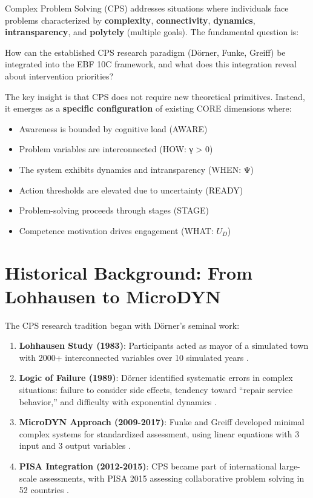Complex Problem Solving (CPS) addresses situations where individuals face problems characterized by \textbf{complexity}, \textbf{connectivity}, \textbf{dynamics}, \textbf{intransparency}, and \textbf{polytely} (multiple goals). The fundamental question is:

\begin{tcolorbox}[colback=yellow!10!white, colframe=orange!75!black,
    title=Central Question]
How can the established CPS research paradigm (Dörner, Funke, Greiff) be integrated into the EBF 10C framework, and what does this integration reveal about intervention priorities?
\end{tcolorbox}

The key insight is that CPS does not require new theoretical primitives. Instead, it emerges as a \textbf{specific configuration} of existing CORE dimensions where:
\begin{itemize}
\item Awareness is bounded by cognitive load (AWARE)
\item Problem variables are interconnected (HOW: γ > 0)
\item The system exhibits dynamics and intransparency (WHEN: Ψ)
\item Action thresholds are elevated due to uncertainty (READY)
\item Problem-solving proceeds through stages (STAGE)
\item Competence motivation drives engagement (WHAT: $U_D$)
\end{itemize}


\section{Historical Background: From Lohhausen to MicroDYN}
\label{sec:cps-history}

The CPS research tradition began with Dörner's seminal work:

\begin{enumerate}
\item \textbf{Lohhausen Study (1983)}: Participants acted as mayor of a simulated town with 2000+ interconnected variables over 10 simulated years \citep{doerner1983lohhausen}.

\item \textbf{Logic of Failure (1989)}: Dörner identified systematic errors in complex situations: failure to consider side effects, tendency toward ``repair service behavior,'' and difficulty with exponential dynamics \citep{doerner1989logik}.

\item \textbf{MicroDYN Approach (2009-2017)}: Funke and Greiff developed minimal complex systems for standardized assessment, using linear equations with 3 input and 3 output variables \citep{greiff2017microdynamapproach}.

\item \textbf{PISA Integration (2012-2015)}: CPS became part of international large-scale assessments, with PISA 2015 assessing collaborative problem solving in 52 countries \citep{oecd2017pisa}.
\end{enumerate}



